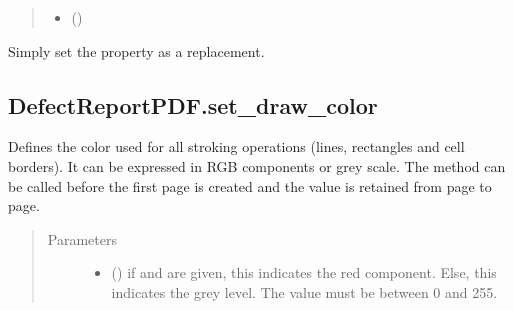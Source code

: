 \documentclass[letterpaper,10pt,english]{sphinxmanual}
\begin{document}
\begin{fulllineitems}
\begin{fulllineitems}
\begin{quote}
\begin{description}
\begin{itemize}
\item {} 
\sphinxAtStartPar
{} () \textendash{} 

\end{itemize}

\end{description}\end{quote}

\sphinxAtStartPar
{}Simply set the  property as a replacement.

\end{fulllineitems}



\subsection{DefectReportPDF.set\_draw\_color}
\label{\detokenize{generated/quality_assessment.quality_pdf_report.DefectReportPDF.set_draw_color:defectreportpdf-set-draw-color}}\label{\detokenize{generated/quality_assessment.quality_pdf_report.DefectReportPDF.set_draw_color::doc}}

\begin{fulllineitems}
\label{\detokenize{generated/quality_assessment.quality_pdf_report.DefectReportPDF.set_draw_color:quality_assessment.quality_pdf_report.DefectReportPDF.set_draw_color}}
\sphinxAtStartPar
Defines the color used for all stroking operations (lines, rectangles and cell borders).
It can be expressed in RGB components or grey scale.
The method can be called before the first page is created and the value is retained from page to page.
\begin{quote}\begin{description}
\item[{Parameters}] \leavevmode\begin{itemize}
\item {} 
\sphinxAtStartPar
{} () \textendash{} if  and  are given, this indicates the red component.
Else, this indicates the grey level. The value must be between 0 and 255.


\end{itemize}
\end{description}
\end{quote}
\end{fulllineitems}
\end{fulllineitems}
\end{document}
